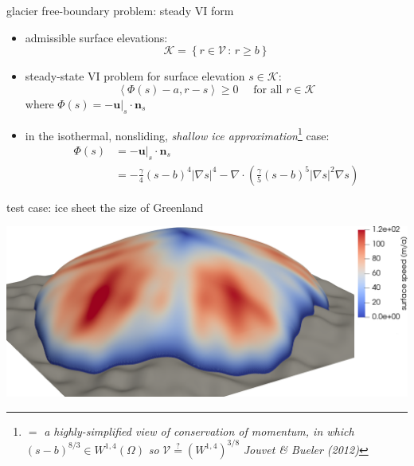 \documentclass[svgnames,
               hyperref={colorlinks,citecolor=DeepPink4,linkcolor=FireBrick,urlcolor=Maroon},
               usepdftitle=false]  %
               {beamer}
\newcommand{\grad}{\nabla}
\newcommand{\bn}{\mathbf{n}}
\newcommand{\bu}{\mathbf{u}}
\newcommand{\ip}[2]{\left<#1,#2\right>}
\begin{document}
\begin{frame}{glacier free-boundary problem: steady VI form}

\begin{itemize}
\item admissible surface elevations:
    $$\mathcal{K} = \left\{r \in \mathcal{V} \,:\, r \ge b\right\}$$
\item steady-state VI problem for surface elevation $s\in\mathcal{K}$:
	$$\ip{\Phi(s) - a}{r-s} \ge 0 \quad \text{ for all } r \in \mathcal{K}$$
where $\Phi(s)=- \bu|_s \cdot \bn_s$
\item in the isothermal, nonsliding, \emph{shallow ice approximation}\footnote{$=$ \emph{a highly-simplified view of conservation of momentum, in which} $(s-b)^{8/3} \in W^{1,4}(\Omega)$ \emph{so} $\mathcal{V} \stackrel{?}{=} (W^{1,4})^{3/8}$ \hfill \emph{Jouvet \& Bueler (2012)}} case:
\begin{align*}
\Phi(s) &= - \bu|_s \cdot \bn_s \\
        &= - \frac{\gamma}{4} (s-b)^{4} |\grad s|^{4} - \grad \cdot\left(\frac{\gamma}{5} (s-b)^{5} |\grad s|^{2} \grad s\right)
\end{align*}
\end{itemize}
\end{frame}


\begin{frame}{test case: ice sheet the size of Greenland}

\centering
\includegraphics[width=\textwidth]{../paper/fixfigs/sialev8scene.png}
\end{frame}
\end{document}
